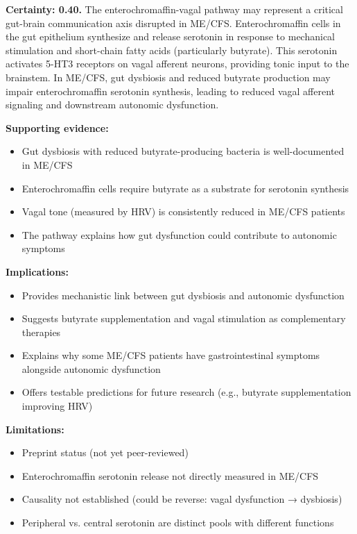 \begin{hypothesis}
\label{hyp:enterochromaffin-vagal}
\textbf{Certainty: 0.40.} The enterochromaffin-vagal pathway may represent a critical gut-brain communication axis disrupted in ME/CFS. Enterochromaffin cells in the gut epithelium synthesize and release serotonin in response to mechanical stimulation and short-chain fatty acids (particularly butyrate). This serotonin activates 5-HT3 receptors on vagal afferent neurons, providing tonic input to the brainstem. In ME/CFS, gut dysbiosis and reduced butyrate production may impair enterochromaffin serotonin synthesis, leading to reduced vagal afferent signaling and downstream autonomic dysfunction.

\textbf{Supporting evidence:}
\begin{itemize}
    \item Gut dysbiosis with reduced butyrate-producing bacteria is well-documented in ME/CFS~\cite{Giloteaux2016, Hsu2025gut}
    \item Enterochromaffin cells require butyrate as a substrate for serotonin synthesis~\cite{Barton2025}
    \item Vagal tone (measured by HRV) is consistently reduced in ME/CFS patients~\cite{Escorihuela2020hrv, walitt2024deep}
    \item The pathway explains how gut dysfunction could contribute to autonomic symptoms
\end{itemize}

\textbf{Implications:}
\begin{itemize}
    \item Provides mechanistic link between gut dysbiosis and autonomic dysfunction
    \item Suggests butyrate supplementation and vagal stimulation as complementary therapies
    \item Explains why some ME/CFS patients have gastrointestinal symptoms alongside autonomic dysfunction
    \item Offers testable predictions for future research (e.g., butyrate supplementation improving HRV)
\end{itemize}

\textbf{Limitations:}
\begin{itemize}
    \item Preprint status (not yet peer-reviewed)
    \item Enterochromaffin serotonin release not directly measured in ME/CFS
    \item Causality not established (could be reverse: vagal dysfunction → dysbiosis)
    \item Peripheral vs. central serotonin are distinct pools with different functions
\end{itemize}
\end{hypothesis}

